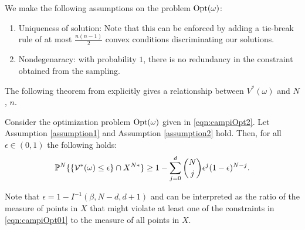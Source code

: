 We make the following assumptions on the problem $\text{Opt}(\omega)$:
\begin{enumerate}
\item \label{assumption1} Uniqueness of solution: Note that this can be enforced by adding a tie-break rule of at most $\frac{n(n-1)}{2}$ convex conditions discriminating our solutions. 
\item \label{assumption2} Nondegenaracy: with probability $1$, there is no redundancy in the constraint obtained from the sampling. 
\end{enumerate}

The following theorem from \cite{campi} explicitly gives a relationship between $V^*(\omega)$ and $N$, $n$.
\begin{theorem}\label{thm:campi}Consider the optimization problem $\text{Opt}(\omega)$ given in \eqref{eqn:campiOpt2}. Let Assumption \ref{assumption1} and Assumption \ref{assumption2} hold. Then, for all $\epsilon \in (0,1)$ the following holds:
\begin{equation*}\mathbb{P}^N\{\{\mathcal{V}^*(\omega) \leq \epsilon\} \cap X^{N*}\} \geq 1- \sum_{j=0}^{d} \binom{N}{j}\epsilon^j (1-\epsilon)^{N-j}.\end{equation*}
\end{theorem}

Note that $\epsilon=1-I^{-1}(\beta, N-d, d+1)$ and can be interpreted as the ratio of the measure of points in $X$ that might violate at least one of the constraints in \eqref{eqn:campiOpt01} to the measure of all points in $X$.

